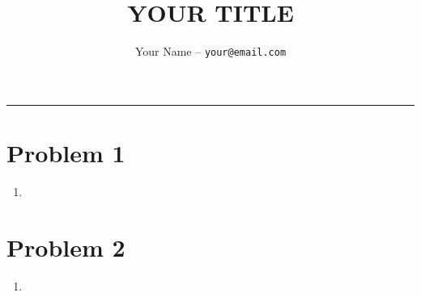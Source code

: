 \documentclass[12pt]{article}
\title{YOUR TITLE}
\author{Your Name -- \texttt{your@email.com}}
\begin{document}
\maketitle
\begin{center}
    \vspace{-0.3in}
\end{center}

\noindent
\rule{\linewidth}{0.4pt}

\section*{Problem 1}
\begin{enumerate}[label=(\alph*)]
    \item
\end{enumerate}

\section*{Problem 2}
\begin{enumerate}[label=(\alph*)]
    \item
\end{enumerate}
\end{document}

